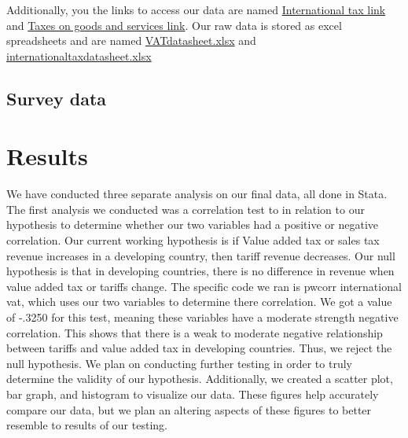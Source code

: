 \documentclass[12pt]{article}
\begin{document}
Additionally, you the links to access our data are named \href{https://wits.worldbank.org/CountryProfile/en/Country/BY-COUNTRY/StartYear/1988/EndYear/2022/Indicator/GC-TAX-INTT-RV-ZS}{International tax link} and \href{https://wits.worldbank.org/CountryProfile/en/country/by-country/startyear/LTST/endyear/LTST/indicator/GC-TAX-GSRV-RV-ZS}{Taxes on goods and services link}. Our raw data is stored as excel spreadsheets and are named \href{https://github.com/ecn310/course-project-taxes-tariffs/blob/main/VATdatasheet.xlsx}{VATdatasheet.xlsx} and \href{https://github.com/ecn310/course-project-taxes-tariffs/blob/main/internationaltaxdatasheet.xlsx}{internationaltaxdatasheet.xlsx}

\subsection{Survey data}

\section{Results}
\label{sec:result}

We have conducted three separate analysis on our final data, all done in Stata. The first analysis we conducted was a correlation test to in relation to our hypothesis to determine whether our two variables had a positive or negative correlation. Our current working hypothesis is if Value added tax or sales tax revenue increases in a developing country, then tariff revenue decreases. Our null hypothesis is that in developing countries, there is no difference in revenue when value added tax or tariffs change. The specific code we ran is pwcorr international vat, which uses our two variables to determine there correlation. We got a value of -.3250 for this test, meaning these variables have a moderate strength negative correlation. This shows that there is a weak to moderate negative relationship between tariffs and value added tax in developing countries. Thus, we reject the null hypothesis. We plan on conducting further testing in order to truly determine the validity of our hypothesis. Additionally, we created a scatter plot, bar graph, and histogram to visualize our data. These figures help accurately compare our data, but we plan an altering aspects of these figures to better resemble to results of our testing. 
\end{document}
